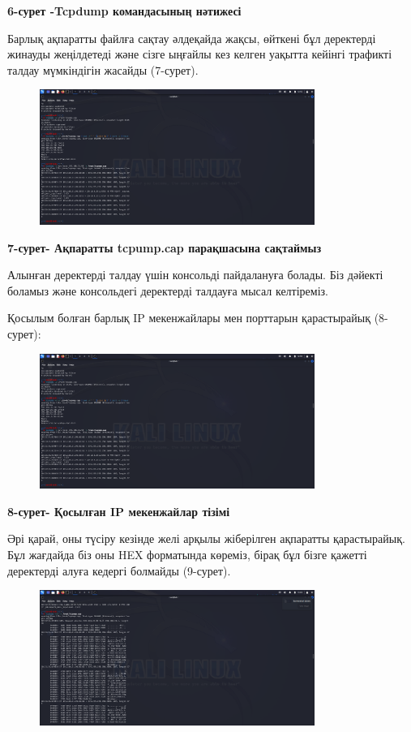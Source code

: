 \textbf{6-сурет -Tcpdump командасының нәтижесі}

Барлық ақпаратты файлға сақтау әлдеқайда жақсы, өйткені бұл деректерді
жинауды жеңілдетеді және сізге ыңғайлы кез келген уақытта кейінгі
трафикті талдау мүмкіндігін жасайды (7-сурет).

\begin{figure}[H]
	\centering
	\includegraphics[width=0.8\textwidth]{assets/31}
	\caption*{}
\end{figure}

\textbf{7-сурет- Ақпаратты tcpump.cap парақшасына сақтаймыз}

Алынған деректерді талдау үшін консольді пайдалануға болады. Біз дәйекті
боламыз және консольдегі деректерді талдауға мысал келтіреміз.

Қосылым болған барлық IP мекенжайлары мен порттарын қарастырайық
(8-сурет):

\begin{figure}[H]
	\centering
	\includegraphics[width=0.8\textwidth]{assets/32}
	\caption*{}
\end{figure}

\textbf{8-сурет- Қосылған IP мекенжайлар тізімі}

Әрі қарай, оны түсіру кезінде желі арқылы жіберілген ақпаратты
қарастырайық. Бұл жағдайда біз оны HEX форматында көреміз, бірақ бұл
бізге қажетті деректерді алуға кедергі болмайды (9-сурет).

\begin{figure}[H]
	\centering
	\includegraphics[width=0.8\textwidth]{assets/33}
	\caption*{}
\end{figure}

